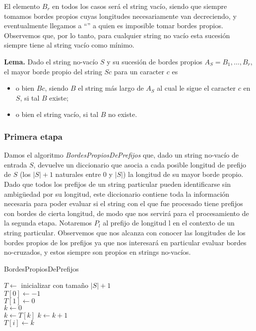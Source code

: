 El elemento $B_r$ en todos los casos será el string vacío, siendo que siempre tomamos bordes propios cuyas longitudes necesariamente van decreciendo, y eventualmente llegamos a ``'' a quien es imposible tomar bordes propios. Observemos que, por lo tanto, para cualquier string no vacío esta sucesión siempre tiene al string vacío como mínimo.

\medskip

\textbf{Lema.} Dado el string no-vacío $S$ y su sucesión de bordes propios $A_S = B_1, \dots, B_r$, el mayor borde propio del string $Sc$ para un caracter $c$ es

\begin{itemize}
\setlength\itemsep{0em}
\item o bien $Bc$, siendo $B$ el string más largo de $A_S$ al cual le sigue el caracter $c$ en $S$, si tal $B$ existe;
\item o bien el string vacío, si tal $B$ no existe.
\end{itemize}

\subsubsection{Primera etapa}

Damos el algoritmo \textit{BordesPropiosDePrefijos} que, dado un string no-vacío de entrada $S$, devuelve un diccionario que asocia a cada posible longitud de prefijo de $S$ (los $|S|+1$ naturales entre 0 y $|S|$) la longitud de su mayor borde propio. Dado que todos los prefijos de un string particular pueden identificarse sin ambigüedad por su longitud, este diccionario contiene toda la información necesaria para poder evaluar si el string con el que fue procesado tiene prefijos con bordes de cierta longitud, de modo que nos servirá para el procesamiento de la segunda etapa. Notaremos $P_l$ al prefijo de longitud l en el contexto de un string particular. Observemos que nos alcanza con conocer las longitudes de los bordes propios de los prefijos ya que nos interesará en particular evaluar bordes no-cruzados, y estos siempre son propios en strings no-vacíos.

\bigskip

\begin{algorithm}[H]
	\caption{BordesPropiosDePrefijos}

	$T \gets$ inicializar con tamaño $|S|+1$ \\
	$T [0] \gets -1$ \\
	$T [1] \gets 0$ \\
	$k \gets 0$ \\
	
     {
	 {
		$k \gets T[k]$
    	}
	$k \gets k+1$ \\
	$T[i] \gets k$
}

\end{algorithm}

